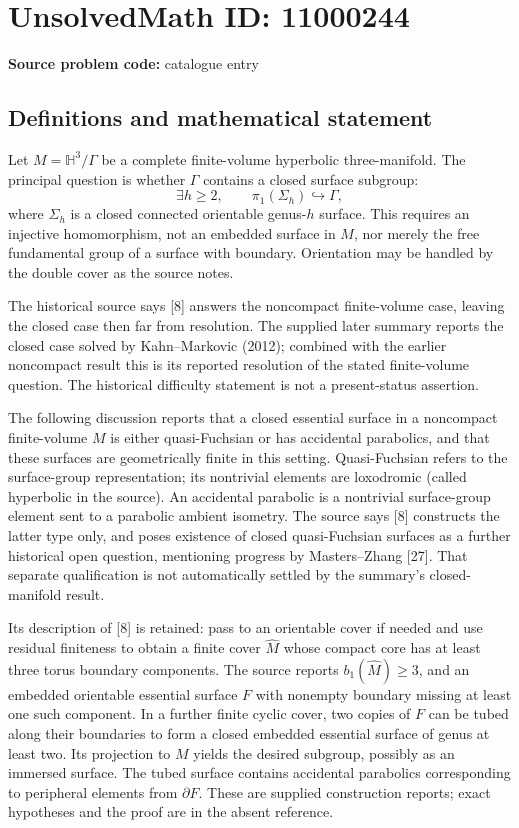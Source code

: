 \documentclass[11pt]{article}
\begin{document}
\section*{UnsolvedMath ID: 11000244}
\textbf{Source problem code:} catalogue entry
\subsection{Definitions and mathematical statement}
Let \(M=\mathbb H^3/\Gamma\) be a complete finite-volume hyperbolic three-manifold. The principal question is whether \(\Gamma\) contains a closed surface subgroup:
\[\exists h\geq2,\qquad\pi_1(\Sigma_h)\hookrightarrow\Gamma,\]
where \(\Sigma_h\) is a closed connected orientable genus-\(h\) surface. This requires an injective homomorphism, not an embedded surface in \(M\), nor merely the free fundamental group of a surface with boundary. Orientation may be handled by the double cover as the source notes.

The historical source says [8] answers the noncompact finite-volume case, leaving the closed case then far from resolution. The supplied later summary reports the closed case solved by Kahn--Markovic (2012); combined with the earlier noncompact result this is its reported resolution of the stated finite-volume question. The historical difficulty statement is not a present-status assertion.

The following discussion reports that a closed essential surface in a noncompact finite-volume \(M\) is either quasi-Fuchsian or has accidental parabolics, and that these surfaces are geometrically finite in this setting. Quasi-Fuchsian refers to the surface-group representation; its nontrivial elements are loxodromic (called hyperbolic in the source). An accidental parabolic is a nontrivial surface-group element sent to a parabolic ambient isometry. The source says [8] constructs the latter type only, and poses existence of closed quasi-Fuchsian surfaces as a further historical open question, mentioning progress by Masters--Zhang [27]. That separate qualification is not automatically settled by the summary's closed-manifold result.

Its description of [8] is retained: pass to an orientable cover if needed and use residual finiteness to obtain a finite cover \(\widehat M\) whose compact core has at least three torus boundary components. The source reports \(b_1(\widehat M)\geq3\), and an embedded orientable essential surface \(F\) with nonempty boundary missing at least one such component. In a further finite cyclic cover, two copies of \(F\) can be tubed along their boundaries to form a closed embedded essential surface of genus at least two. Its projection to \(M\) yields the desired subgroup, possibly as an immersed surface. The tubed surface contains accidental parabolics corresponding to peripheral elements from \(\partial F\). These are supplied construction reports; exact hypotheses and the proof are in the absent reference.
\end{document}
